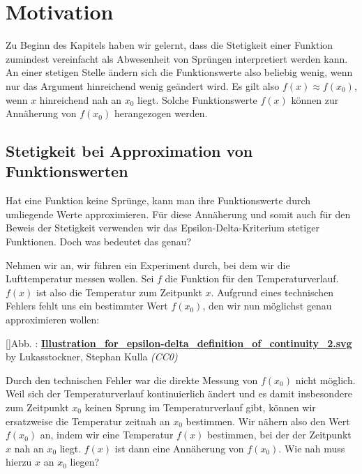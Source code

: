 \documentclass[fontsize=9pt,
               parskip=half-,
               DIV=14,
               listof=chapterentry,
               tocflat]{scrbook}
\newcounter{imagelabel}
\begin{document}
\section{Motivation}

Zu Beginn des Kapitels haben wir gelernt, dass die Stetigkeit einer Funktion zumindest vereinfacht als Abwesenheit von Sprüngen interpretiert werden kann. An einer stetigen Stelle ändern sich die Funktionswerte also beliebig wenig, wenn nur das Argument hinreichend wenig geändert wird. Es gilt also $f(x)\approx f(x_{0})$, wenn $x$ hinreichend nah an $x_{0}$ liegt. Solche Funktionswerte $f(x)$ können zur Annäherung von $f(x_{0})$ herangezogen werden.

\subsection{Stetigkeit bei Approximation von Funktionswerten}

Hat eine Funktion keine Sprünge, kann man ihre Funktionswerte durch umliegende Werte approximieren. Für diese Annäherung und somit auch für den Beweis der Stetigkeit verwenden wir das Epsilon-Delta-Kriterium stetiger Funktionen. Doch was bedeutet das genau?

Nehmen wir an, wir führen ein Experiment durch, bei dem wir die Lufttemperatur messen wollen. Sei $f$ die Funktion für den Temperaturverlauf. $f(x)$ ist also die Temperatur zum Zeitpunkt $x$. Aufgrund eines technischen Fehlers fehlt uns ein bestimmter Wert $f(x_{0})$, den wir nun möglichst genau approximieren wollen:

[]{Abb. : \protect\href{https://commons.wikimedia.org/wiki/File:Illustration_for_epsilon-delta_definition_of_continuity_2.svg}{\textbf{Illustration\allowbreak\_for\allowbreak\_epsilon\allowbreak-delta\allowbreak\_definition\allowbreak\_of\allowbreak\_continuity\allowbreak\_2.svg}} by Lukasstockner, Stephan Kulla \textit{(CC0)}}\begin{center}
\end{center}

Durch den technischen Fehler war die direkte Messung von $f(x_{0})$ nicht möglich. Weil sich der Temperaturverlauf kontinuierlich ändert und es damit insbesondere zum Zeitpunkt $x_{0}$ keinen Sprung im Temperaturverlauf gibt, können wir ersatzweise die Temperatur zeitnah an $x_{0}$ bestimmen. Wir nähern also den Wert $f(x_{0})$ an, indem wir eine Temperatur $f(x)$ bestimmen, bei der der Zeitpunkt $x$ nah an $x_{0}$ liegt. $f(x)$ ist dann eine Annäherung von $f(x_{0})$. Wie nah muss hierzu $x$ an $x_{0}$ liegen?
\end{document}
